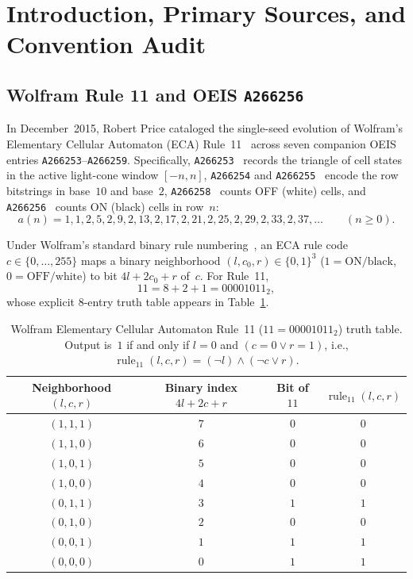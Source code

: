 \documentclass[11pt]{article}
\theoremstyle{definition}
\newcommand{\seq}[1]{\texttt{#1}}
\newcommand{\ruleTT}{\operatorname{rule}_{11}}
\begin{document}
\section{Introduction, Primary Sources, and Convention Audit}

\subsection{Wolfram Rule 11 and OEIS \texorpdfstring{\seq{A266256}}{A266256}}

In December~2015, Robert Price cataloged the single-seed evolution of Wolfram's Elementary Cellular Automaton (ECA) Rule~11~\cite{wolfram2002,mathworldECA} across seven companion OEIS entries \seq{A266253}--\seq{A266259}. Specifically, \seq{A266253}~\cite{oeis266253} records the triangle of cell states in the active light-cone window $[-n, n]$, \seq{A266254} and \seq{A266255}~\cite{oeis266254,oeis266255} encode the row bitstrings in base~$10$ and base~$2$, \seq{A266258}~\cite{oeis266258} counts OFF (white) cells, and \seq{A266256}~\cite{oeis266256} counts ON (black) cells in row~$n$:
\[
a(n) = 1, 1, 2, 5, 2, 9, 2, 13, 2, 17, 2, 21, 2, 25, 2, 29, 2, 33, 2, 37, \dots \qquad (n \ge 0).
\]

Under Wolfram's standard binary rule numbering~\cite{wolfram2002}, an ECA rule code $c \in \{0, \dots, 255\}$ maps a binary neighborhood $(l, c_0, r) \in \{0, 1\}^3$ ($1 = \text{ON/black}$, $0 = \text{OFF/white}$) to bit $4l + 2c_0 + r$ of~$c$. For Rule~11,
\[
11 = 8 + 2 + 1 = 00001011_2,
\]
whose explicit $8$-entry truth table appears in Table~\ref{tab:rule11-tt}.

\begin{table}[ht]
\centering
\caption{Wolfram Elementary Cellular Automaton Rule~11 ($11 = 00001011_2$) truth table. Output is~$1$ if and only if $l = 0$ and $(c = 0 \lor r = 1)$, i.e., $\ruleTT(l, c, r) = (\neg l) \land (\neg c \lor r)$.}
\label{tab:rule11-tt}
\smallskip
{\small
\begin{tabular}{@{}c c c c@{}}
\toprule
Neighborhood $(l, c, r)$ & Binary index $4l + 2c + r$ & Bit of $11$ & $\ruleTT(l, c, r)$ \\
\midrule
$(1, 1, 1)$ & $7$ & $0$ & $0$ \\
$(1, 1, 0)$ & $6$ & $0$ & $0$ \\
$(1, 0, 1)$ & $5$ & $0$ & $0$ \\
$(1, 0, 0)$ & $4$ & $0$ & $0$ \\
$(0, 1, 1)$ & $3$ & $1$ & $1$ \\
$(0, 1, 0)$ & $2$ & $0$ & $0$ \\
$(0, 0, 1)$ & $1$ & $1$ & $1$ \\
$(0, 0, 0)$ & $0$ & $1$ & $1$ \\
\bottomrule
\end{tabular}
}
\end{table}
\end{document}
